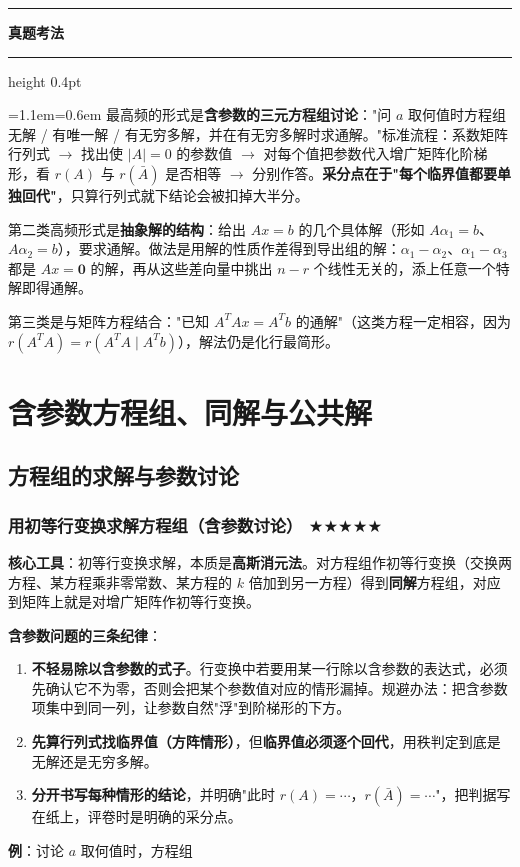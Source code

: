 \documentclass[11pt,openany,UTF8]{ctexbook}
\newcommand{\callouthead}[2]{%
  \par\addvspace{7pt}\noindent
  {\color{#1}\rule[-0.15em]{3pt}{1.05em}}\hspace{0.5em}%
  {\bfseries\color{#1}#2}\par\nobreak\vspace{-0.35em}%
  {\color{rulesep}\hrule height 0.4pt}\nobreak\vspace{0.45em}%
  \begingroup\small\setlength{\parindent}{0pt}%
  \leftskip=1.1em\rightskip=0.6em\noindent\ignorespaces}
\newcommand{\calloutend}{\par\endgroup\addvspace{7pt}}
\newenvironment{callexam}[1]{\callouthead{exambar}{#1}}{\calloutend}
\begin{document}
\begin{callexam}{真题考法}
最高频的形式是\textbf{含参数的三元方程组讨论}："问 $a$ 取何值时方程组无解 / 有唯一解 / 有无穷多解，并在有无穷多解时求通解。"标准流程：系数矩阵行列式 $\to$ 找出使 $\vert A\vert=0$ 的参数值 $\to$ 对每个值把参数代入增广矩阵化阶梯形，看 $r(A)$ 与 $r(\bar A)$ 是否相等 $\to$ 分别作答。\textbf{采分点在于"每个临界值都要单独回代"}，只算行列式就下结论会被扣掉大半分。

第二类高频形式是\textbf{抽象解的结构}：给出 $Ax=b$ 的几个具体解（形如 $A\alpha_1=b$、$A\alpha_2=b$），要求通解。做法是用解的性质作差得到导出组的解：$\alpha_1-\alpha_2$、$\alpha_1-\alpha_3$ 都是 $Ax=\mathbf{0}$ 的解，再从这些差向量中挑出 $n-r$ 个线性无关的，添上任意一个特解即得通解。

第三类是与矩阵方程结合："已知 $A^TAx=A^Tb$ 的通解"（这类方程一定相容，因为 $r(A^TA)=r(A^TA\mid A^Tb)$），解法仍是化行最简形。

\end{callexam}

\section{含参数方程组、同解与公共解}

\subsection{方程组的求解与参数讨论}

\subsubsection{用初等行变换求解方程组（含参数讨论） $\bigstar$$\bigstar$$\bigstar$$\bigstar$$\bigstar$}

\textbf{核心工具}：初等行变换求解，本质是\textbf{高斯消元法}。对方程组作初等行变换（交换两方程、某方程乘非零常数、某方程的 $k$ 倍加到另一方程）得到\textbf{同解}方程组，对应到矩阵上就是对增广矩阵作初等行变换。

\textbf{含参数问题的三条纪律}：

\begin{enumerate}
\item \textbf{不轻易除以含参数的式子}。行变换中若要用某一行除以含参数的表达式，必须先确认它不为零，否则会把某个参数值对应的情形漏掉。规避办法：把含参数项集中到同一列，让参数自然"浮"到阶梯形的下方。
\item \textbf{先算行列式找临界值（方阵情形）}，但\textbf{临界值必须逐个回代}，用秩判定到底是无解还是无穷多解。
\item \textbf{分开书写每种情形的结论}，并明确"此时 $r(A)=\cdots$，$r(\bar A)=\cdots$"，把判据写在纸上，评卷时是明确的采分点。
\end{enumerate}
\textbf{例}：讨论 $a$ 取何值时，方程组
\end{document}
